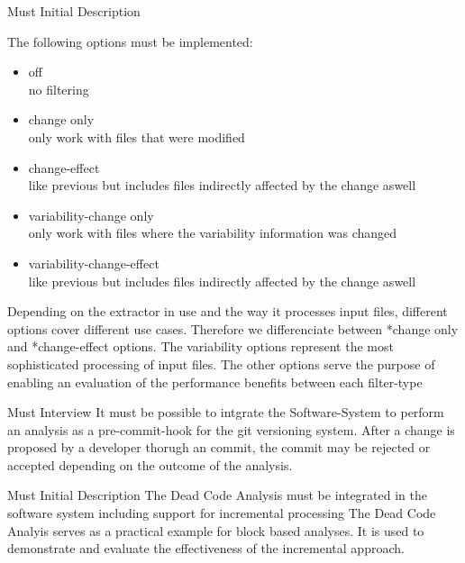 \documentclass[a4paper]{article}
\begin{document}
\clearpage
\begin{req} \label{req:optimization}
\reqtable
	{Must}  {Initial Description}
	{
	The following options must be implemented:
	\begin{itemize}
		\item off \\
		no filtering 
	    \item change only \\
	    only work with files that were modified
	    \item change-effect \\
	    like previous but includes files indirectly affected by the change aswell
	    \item variability-change only \\
	     only work with files where the variability information was changed
	    \item variability-change-effect \\
	    like previous but includes files indirectly affected by the change aswell
	\end{itemize}
    }
	{Depending on the extractor in use and the way it processes input files, different options cover different use cases. Therefore we differenciate between *change only and *change-effect options. The variability options represent the most sophisticated processing of input files. The other options serve the purpose of enabling an evaluation of the performance benefits between each filter-type }

\end{req}

\begin{req} \label{req:commit-hook}
\reqtable
	{Must}  {Interview}
	{It must be possible to intgrate the Software-System to perform an analysis as a pre-commit-hook for the git versioning system.}
	{After a change is proposed by a developer thorugh an commit, the commit may be rejected or accepted depending on the outcome of the analysis.}

\end{req}

\begin{req} 
\reqtable
	{Must}  {Initial Description}
	{The Dead Code Analysis must be integrated in the software system including support for incremental processing}
	{The Dead Code Analyis serves as a practical example for block based analyses. It is used to demonstrate and evaluate the effectiveness of the incremental approach.}
\end{req}
\end{document}
